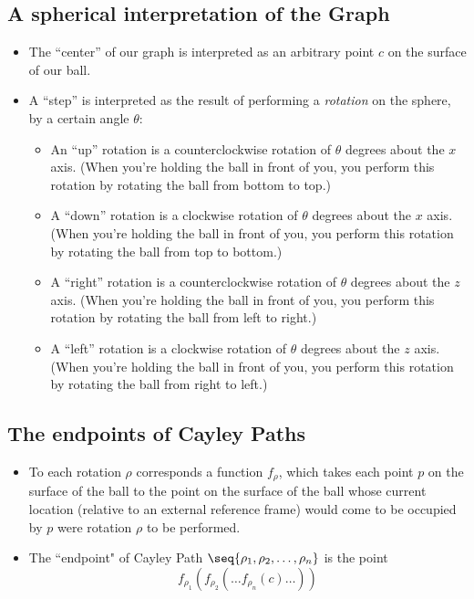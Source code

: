 \documentclass[12pt]{extarticle}
\begin{document}
\subsection{A spherical interpretation of the Graph}
\begin{itemize}
\item The ``center'' of our graph is interpreted as an arbitrary point $c$ on the surface of our ball. 

\item A ``step'' is interpreted as the result of performing a \emph{rotation} on the sphere, by a certain angle $\theta$:




\begin{itemize}

\item An ``up'' rotation is a counterclockwise rotation of \(\theta\) degrees about the \(x\) axis. (When you're holding the ball in front of you, you perform this rotation by rotating the ball from bottom to top.)

\item A ``down'' rotation is a clockwise rotation of \(\theta\) degrees about the \(x\) axis. (When you're holding the ball in front of you, you perform this rotation by rotating the ball from top to bottom.)

\item A ``right'' rotation is a counterclockwise rotation of \(\theta\) degrees about the \(z\) axis. (When you're holding the ball in front of you, you perform this rotation by rotating the ball from left to right.)

\item A ``left'' rotation is a clockwise rotation of \(\theta\) degrees about the \(z\) axis. (When you're holding the ball in front of you, you perform this rotation by rotating the ball from right to left.)


\end{itemize}



\end{itemize}

\subsection{The endpoints of Cayley Paths}

\begin{itemize}

\item To each rotation \(\rho\) corresponds a function \(f_\rho\), which takes each point \(p\) on the surface of the ball to the point on the surface of the ball whose current location (relative to an external reference frame) would come to be occupied by \(p\) were rotation \(\rho\) to be performed. 

\item The ``endpoint" of Cayley Path \(\seq{\rho_1,\rho_2,\dots,\rho_n}\) is the point $$f_{\rho_1}(f_{\rho_2}(\dots f_{\rho_n}(c)\dots))$$


\end{itemize}
\end{document}
